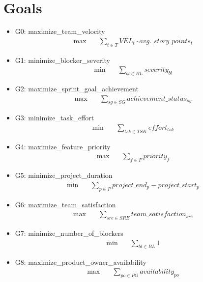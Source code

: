 \documentclass{article}
\begin{document}
\section{Goals}
\begin{itemize}
    \item G0: maximize\_team\_velocity
        \begin{align*}
            \max \quad &\sum_{t \in T} VEL_{t} \cdot avg.\_story\_points_{t}
        \end{align*}
    \item G1: minimize\_blocker\_severity
        \begin{align*}
            \min \quad &\sum_{bl \in BL} severity_{bl}
        \end{align*}
    \item G2: maximize\_sprint\_goal\_achievement
        \begin{align*}
            \max \quad &\sum_{sg \in SG} achievement\_status_{sg}
        \end{align*}
    \item G3: minimize\_task\_effort
        \begin{align*}
            \min \quad &\sum_{tsk \in TSK} effort_{tsk}
        \end{align*}
    \item G4: maximize\_feature\_priority
        \begin{align*}
            \max \quad &\sum_{f \in F} priority_{f}
        \end{align*}
    \item G5: minimize\_project\_duration
        \begin{align*}
            \min \quad &\sum_{p \in P} project\_end_{p} - project\_start_{p}
        \end{align*}
    \item G6: maximize\_team\_satisfaction
        \begin{align*}
            \max \quad &\sum_{sre \in SRE} team\_satisfaction_{sre}
        \end{align*}
    \item G7: minimize\_number\_of\_blockers
        \begin{align*}
            \min \quad &\sum_{bl \in BL} 1
        \end{align*}
    \item G8: maximize\_product\_owner\_availability
        \begin{align*}
            \max \quad &\sum_{po \in PO} availability_{po}
        \end{align*}

\end{itemize}
\end{document}
